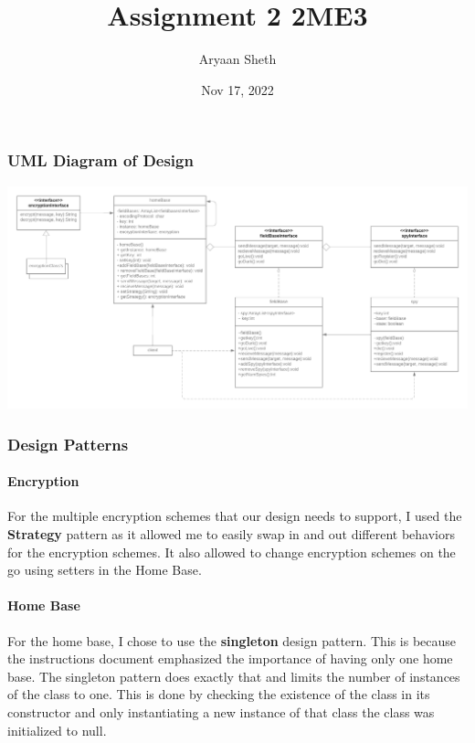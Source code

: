 \documentclass[12pt]{article}
\title{Assignment 2 2ME3}
\author{Aryaan Sheth}
\date{Nov 17, 2022}
\begin{document}
    \maketitle
    \newpage
    \tableofcontents
    \newpage

    \part{}
    \section{UML Diagram of Design}
        \includegraphics[scale=.25]{part1_uml}

    \section{Design Patterns}
        \subsection*{Encryption}
            For the multiple encryption schemes that our design needs to support, I used the \textbf{Strategy}
            pattern as it allowed me to easily swap in and out different behaviors for the encryption schemes.
            It also allowed to change encryption schemes on the go using setters in the Home Base. 

        \subsection*{Home Base}
            For the home base, I chose to use the \textbf{singleton} design pattern. This is because
            the instructions document emphasized the importance of having only one home base. The singleton
            pattern does exactly that and limits the number of instances of the class to one. 
            This is done by checking the existence of the class in its constructor and only instantiating a new
            instance of that class the class was initialized to null. 
        
\end{document}
